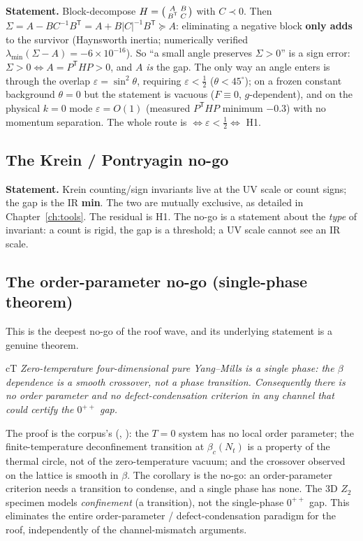 \textbf{Statement.} Block-decompose $H=\begin{psmallmatrix}A&B\\B^{\mathsf T}&C\end{psmallmatrix}$
with $C\prec0$. Then $\Sigma=A-BC^{-1}B^{\mathsf T}=A+B|C|^{-1}B^{\mathsf T}\succeq A$:
eliminating a negative block \textbf{only adds} to the survivor (Haynsworth inertia; numerically
verified $\lambda_{\min}(\Sigma-A)=-6\times10^{-16}$). So ``a small angle preserves $\Sigma>0$''
is a sign error: $\Sigma>0\iff A=P^{\mathsf T}HP>0$, and $A$ \emph{is} the gap. The only way an
angle enters is through the overlap $\varepsilon=\sin^2\theta$, requiring
$\varepsilon<\tfrac12$ ($\theta<45^\circ$); on a frozen constant background $\theta=0$ but the
statement is vacuous ($F\equiv0$, $g$-dependent), and on the physical $k=0$ mode
$\varepsilon=O(1)$ (measured $P^{\mathsf T}HP$ minimum $-0.3$) with no momentum separation. The
whole route is $\iff\varepsilon<\tfrac12\iff$ H1.

\subsection{The Krein / Pontryagin no-go}

\textbf{Statement.} Krein counting/sign invariants live at the UV scale or count signs; the gap
is the IR \textbf{min}. The two are mutually exclusive, as detailed in Chapter~\ref{ch:tools}.
The residual is H1. The no-go is a statement about the \emph{type} of invariant: a count is
rigid, the gap is a threshold; a UV scale cannot see an IR scale.

\subsection{The order-parameter no-go (single-phase theorem)}
\label{sec:b2}

This is the deepest no-go of the roof wave, and its underlying statement is a genuine theorem.

\begin{claimbox}{cT}
 \emph{Zero-temperature four-dimensional pure
Yang--Mills is a single phase: the $\beta$ dependence is a smooth crossover, not a phase
transition. Consequently there is no order parameter and no defect-condensation criterion in
any channel that could certify the $0^{++}$ gap.}
\end{claimbox}

The proof is the corpus's (, ): the
$T=0$ system has no local order parameter; the finite-temperature deconfinement transition at
$\beta_c(N_t)$ is a property of the thermal circle, not of the zero-temperature vacuum; and the
crossover observed on the lattice is smooth in $\beta$. The corollary is the no-go: an
order-parameter criterion needs a transition to condense, and a single phase has none. The 3D
$Z_2$ specimen models \emph{confinement} (a transition), not the single-phase $0^{++}$ gap. This
eliminates the entire order-parameter / defect-condensation paradigm for the roof, independently
of the channel-mismatch arguments.

